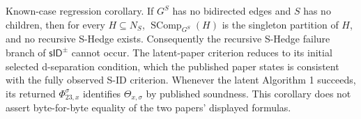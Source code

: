 Known-case regression corollary. If \(G^S\) has no bidirected edges and \(S\) has no children, then for every \(H\subseteq N_S\), \(\operatorname{SComp}_{G^S}(H)\) is the singleton partition of \(H\), and no recursive S-Hedge exists. Consequently the recursive S-Hedge failure branch of \(\mathsf{sID}^{\pm}\) cannot occur. The latent-paper criterion reduces to its initial selected d-separation condition, which the published paper states is consistent with the fully observed S-ID criterion. Whenever the latent Algorithm 1 succeeds, its returned \(\Phi_{23,x}^{\sigma}\) identifies \(\Theta_{x,\sigma}\) by published soundness. This corollary does not assert byte-for-byte equality of the two papers' displayed formulas.